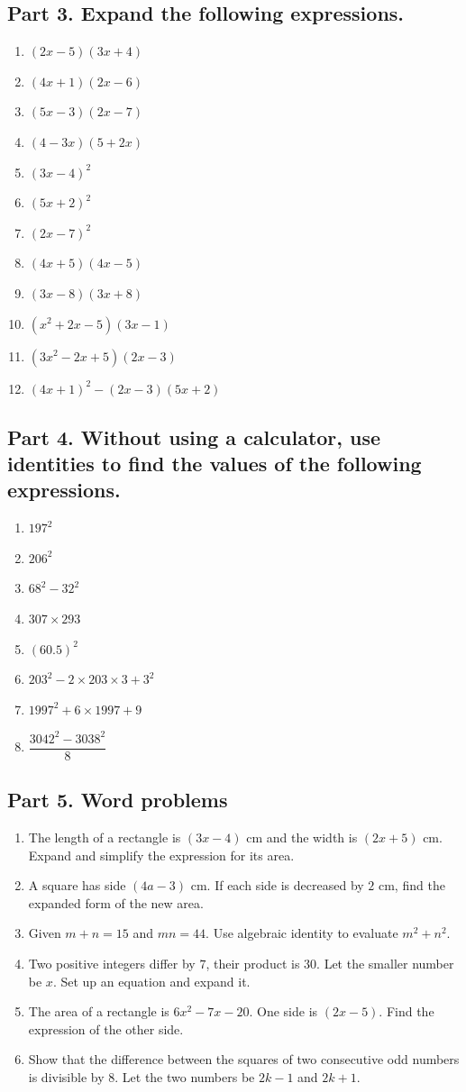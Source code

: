 \documentclass[12pt,a4paper,]{article}
\begin{document}
	\subsection*{Part 3. Expand the following expressions.}
	\begin{enumerate}
		\item $(2x-5)(3x+4)$
		\item $(4x+1)(2x-6)$
		\item $(5x-3)(2x-7)$
		\item $(4-3x)(5+2x)$
		\item $(3x-4)^2$
		\item $(5x+2)^2$
		\item $(2x-7)^2$
		\item $(4x+5)(4x-5)$
		\item $(3x-8)(3x+8)$
		\item $(x^2+2x-5)(3x-1)$
		\item $(3x^2-2x+5)(2x-3)$
		\item $(4x+1)^2-(2x-3)(5x+2)$
	\end{enumerate}
	\newpage
	\subsection*{Part 4. Without using a calculator, use identities to find the values of the following expressions.}
	\begin{enumerate}
		\item $197^2$
		\item $206^2$
		\item $68^2-32^2$
		\item $307\times293$
		\item $(60.5)^2$
		\item $203^2-2\times 203 \times 3 +3^2$
		\item $1997^2+6\times1997+9$
		\item $\dfrac{3042^2-3038^2}{8}$
	\end{enumerate}
	\subsection*{Part 5. Word problems}
	\begin{enumerate}
		\item The length of a rectangle is $(3x-4)$ cm and the width is $(2x+5)$ cm. Expand and simplify the expression for its area.
		\item A square has side $(4a-3)$ cm. If each side is decreased by $2$ cm, find the expanded form of the new area.
		\item Given $m+n=15$ and $mn=44$. Use algebraic identity to evaluate $m^2 + n^2$.
		\item Two positive integers differ by $7$, their product is $30$. Let the smaller number be $x$. Set up an equation and expand it.
		\item The area of a rectangle is $6x^2-7x-20$. One side is $(2x-5)$. Find the expression of the other side.
		\item Show that the difference between the squares of two consecutive odd numbers is divisible by $8$. Let the two numbers be $2k-1$ and $2k+1$.
	\end{enumerate}
\end{document}
